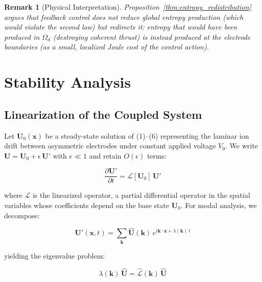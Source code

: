 \documentclass[12pt,twocolumn]{article}
\newtheorem{remark}{Remark}
\newcommand{\uu}{\mathbf{U}}
\newcommand{\Lop}{\mathcal{L}}
\begin{document}
\begin{remark}[Physical Interpretation]
Proposition~\ref{thm:entropy_redistribution} argues that feedback
control does not \emph{reduce} global entropy production (which would
violate the second law) but \emph{redirects} it: entropy that would
have been produced in $\Omega_d$ (destroying coherent thrust) is
instead produced at the electrode boundaries (as a small, localized
Joule cost of the control action).
\end{remark}

\section{Stability Analysis}
\label{sec:stability}

\subsection{Linearization of the Coupled System}
\label{sec:stability:linearization}

Let $\uu_0(\mathbf{x})$ be a steady-state solution of (1)--(6)
representing the laminar ion drift between asymmetric electrodes
under constant applied voltage $V_0$. We write
$\uu = \uu_0 + \epsilon\,\uu'$ with $\epsilon \ll 1$ and retain
$O(\epsilon)$ terms:

\begin{equation}
  \frac{\partial \uu'}{\partial t} = \Lop[\uu_0]\,\uu'
  \label{eq:linearized_full}
\end{equation}

where $\Lop$ is the linearized operator, a partial differential
operator in the spatial variables whose coefficients depend on the
base state $\uu_0$. For modal analysis, we decompose:

\begin{equation}
  \uu'(\mathbf{x}, t)
  = \sum_{\mathbf{k}} \hat{\uu}(\mathbf{k})\,
    e^{i\mathbf{k}\cdot\mathbf{x} + \lambda(\mathbf{k})\,t}
  \label{eq:modal_decomposition}
\end{equation}

yielding the eigenvalue problem:

\begin{equation}
  \lambda(\mathbf{k})\,\hat{\uu}
  = \hat{\Lop}(\mathbf{k})\,\hat{\uu}
  \label{eq:dispersion_EVP}
\end{equation}
\end{document}
